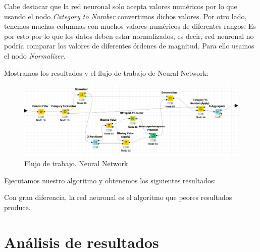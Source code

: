 	Cabe destacar que la red neuronal solo acepta valores numéricos por lo que usando el nodo \textit{Category to Number} convertimos dichos valores. Por otro lado, tenemos muchas columnas con muchos valores numéricos de diferentes rangos. Es por esto por lo que los datos deben estar normalizados, es decir, red neuronal no podría comparar los valores de diferentes órdenes de magnitud.
	Para ello usamos el nodo \textit{Normalizer}.
	\newpage
	
	Mostramos los resultados y el flujo de trabajo de Neural Network: 
	\begin{figure}[H]
		    \centering
			\includegraphics[width=1\textwidth]{img/Neural.png}
			\caption{Flujo de trabajo. Neural Network}
		\end{figure}
	
	Ejecutamos nuestro  algoritmo y obtenemos los siguientes resultados:
	
	\begin{table}[]
	\end{table}

	Con gran diferencia, la red neuronal es el algoritmo que peores resultados produce.

	\section{Análisis de resultados}
	
